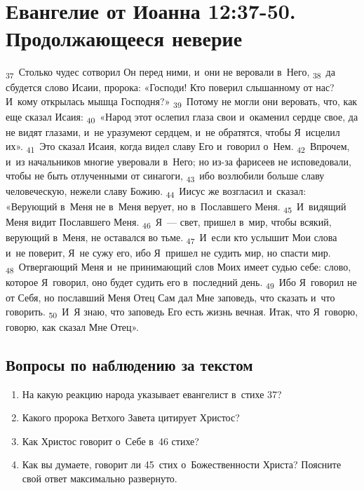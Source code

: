 \documentclass[a4paper,12pt]{article}
\begin{document}

\section{Евангелие от Иоанна 12:37-50. Продолжающееся неверие}

\textsubscript{37}~Столько чудес сотворил Он перед ними, и~они не веровали в~Него, \textsubscript{38}~да сбудется слово Исаии, пророка: «Господи! Кто поверил слышанному от нас? И~кому открылась мышца Господня?» \textsubscript{39}~Потому не могли они веровать, что, как еще сказал Исаия: \textsubscript{40}~«Народ этот ослепил глаза свои и~окаменил сердце свое, да не видят глазами, и~не уразумеют сердцем, и~не обратятся, чтобы Я~исцелил их». \textsubscript{41}~Это сказал Исаия, когда видел славу Его и~говорил о~Нем. \textsubscript{42}~Впрочем, и~из начальников многие уверовали в~Него; но из-за фарисеев не исповедовали, чтобы не быть отлученными от синагоги, \textsubscript{43}~ибо возлюбили больше славу человеческую, нежели славу Божию. \textsubscript{44}~Иисус же возгласил и~сказал: «Верующий в~Меня не в~Меня верует, но в~Пославшего Меня. \textsubscript{45}~И~видящий Меня видит Пославшего Меня. \textsubscript{46}~Я~— свет, пришел в~мир, чтобы всякий, верующий в~Меня, не оставался во тьме. \textsubscript{47}~И~если кто услышит Мои слова и~не поверит, Я~не сужу его, ибо Я~пришел не судить мир, но спасти мир. \textsubscript{48}~Отвергающий Меня и~не принимающий слов Моих имеет судью себе: слово, которое Я~говорил, оно будет судить его в~последний день. \textsubscript{49}~Ибо Я~говорил не от Себя, но пославший Меня Отец Сам дал Мне заповедь, что сказать и~что говорить. \textsubscript{50}~И~Я знаю, что заповедь Его есть жизнь вечная. Итак, что Я~говорю, говорю, как сказал Мне Отец». 

\subsection*{Вопросы по наблюдению за текстом}
\begin{enumerate}
    \item На какую реакцию народа указывает евангелист в~стихе 37? 
    
    \myline
    
    \myline
    \item Какого пророка Ветхого Завета цитирует Христос? 
    
    \myline
    
    \myline
    \item Как Христос говорит о~Себе в~46 стихе? 
    
    \myline
    
    \myline
    \item Как вы думаете, говорит ли 45~стих о~Божественности Христа? Поясните свой ответ максимально развернуто. 
    
    \myline
    
    \myline
\end{enumerate}
\end{document}
